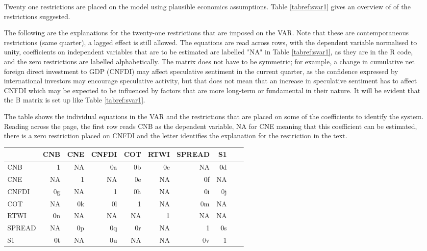 \documentclass[jrfm,communication,submit,moreauthors,pdftex]{Definitions/mdpi}
\begin{document}
Twenty one restrictions are placed on the model using plausible economics assumptions. Table \ref{tabref:svar1} gives an overview of of the restrictions suggested.  

The following are the explanations for the twenty-one restrictions that are imposed on the VAR.  Note that these are contemporaneous restrictions (same quarter), a lagged effect is still allowed.  The equations are read across rows, with the dependent variable normalised to unity, coefficients on independent variables that are to be estimated are labelled "NA" in Table \ref{tabref:svar1}, as they are in the R code, and the zero restrictions are labelled alphabetically.  The matrix does not have to be symmetric; for example, a change in cumulative net foreign direct investment to GDP (CNFDI) may affect speculative sentiment in the current quarter, as the confidence expressed by international investors may encourage speculative activity, but that does not mean that an increase in speculative sentiment has to affect CNFDI which may be expected to be influenced by factors that are more long-term or fundamental in their nature.    It will be evident that the B matrix is set up like Table \ref{tabref:svar1}.   

\begin{specialtable}[h]
\caption{The table shows the individual equations in the VAR and the restrictions that are placed on some of the coefficients to identify the system.  Reading across the page, the first row reads CNB as the dependent variable, NA for CNE meaning that this coefficient can be estimated, there is a zero restriction placed on CNFDI and the letter identifies the explanation for the restriction in the text.}
\begin{tabular}{p{3cm} rrrrrrrrr}	
  \toprule
 &  CNB & CNE & CNFDI & COT & RTWI & SPREAD & S1 \\ 
  \midrule
  CNB & 1 & NA & 0a & 0b & 0c & NA & 0d\\ 
  CNE & NA & 1 & NA & 0e & NA & 0f & NA\\ 
  CNFDI & 0g & NA & 1 & 0h & NA & 0i & 0j\\ 
  COT & NA & 0k & 0l & 1 & NA & 0m & NA \\ 
   RTWI & 0n & NA & NA & NA & 1 & NA & NA\\ 
  SPREAD & NA & 0p & 0q & 0r & NA & 1 & 0s\\ 
  S1 & 0t & NA & 0u & NA & NA & 0v & 1   
\end{tabular}
\label{tabref:svar1}
\end{specialtable}
\end{document}
